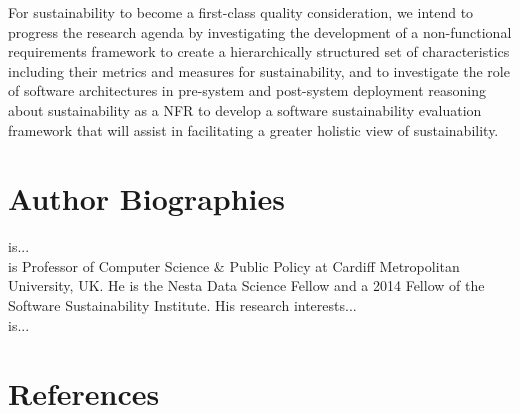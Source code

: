 \documentclass[preprint,12pt,authoryear]{elsarticle}
\begin{document}
For sustainability to become a first-class quality consideration, we
intend to progress the research agenda by investigating the
development of a non-functional requirements framework to create a
hierarchically structured set of characteristics including their
metrics and measures for sustainability, and to investigate the role
of software architectures in pre-system and post-system deployment
reasoning about sustainability as a NFR to develop a software
sustainability evaluation framework that will assist in facilitating a
greater holistic view of sustainability.




\section*{Author Biographies}

 is...\\

 is Professor of Computer Science \& Public Policy
at Cardiff Metropolitan University, UK. He is the Nesta Data Science
Fellow and a 2014 Fellow of the Software Sustainability
Institute. His research interests...\\

 is...


\section*{References}\label{sec:refs}

 






\end{document}
